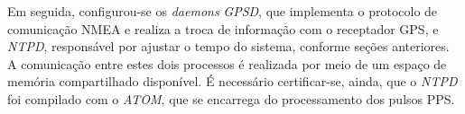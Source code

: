\vspace{12pt}

Em seguida, configurou-se os \textit{daemons} \textit{GPSD}, que implementa o
protocolo de comunicação NMEA e realiza a troca de informação com o receptador
GPS, e \textit{NTPD}, responsável por ajustar o tempo do sistema, conforme
seções anteriores. A comunicação entre estes dois processos é realizada por meio de um
espaço de memória compartilhado disponível. É necessário certificar-se, ainda,
que o \textit{NTPD} foi compilado com o \textit{ATOM}, que se encarrega do
processamento dos pulsos PPS.

% 
%  
% 
% 
% 
% 
%  
% 
% 
% 
